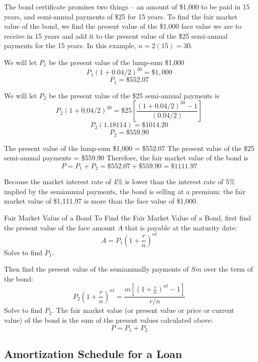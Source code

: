 \begin{solution}
    The bond certificate promises two things – an amount of \$1,000 to be paid in 15 years, and semi-annual payments of \$25 for 15 years. To find the fair market value of the bond, we find the present value of the \$1,000 face value we are to receive in 15 years and add it to the present value of the \$25 semi-annual payments for the 15 years. In this example, \( n = 2(15)=30 \).

    We will let \( P_1 \) be the present value of the lump-sum \$1,000
    \[ P_1(1 + 0.04/2)^{30} = \$1,000 \]
    \[ P_1 = \$552.07 \]

    We will let \( P_2 \) be the present value of the \$25 semi-annual payments is
    \[ P_2 (1 + 0.04/2)^{30} = \$25\left[\frac{(1 + 0.04/2)^{30} - 1}{(0.04/2)}\right] \]
    \[ P_2 (1.18114) = \$1014.20 \]
    \[ P_2 = \$559.90 \]

    The present value of the lump-sum \$1,000 = \$552.07
    The present value of the \$25 semi-annual payments = \$559.90
    Therefore, the fair market value of the bond is
    \[ P = P_1+P_2 = \$552.07 + \$559.90 = \$1111.97 \]

    Because the market interest rate of 4\% is lower than the interest rate of 5\% implied by the semiannual payments, the bond is selling at a premium: the fair market value of \$1,111.97 is more than the face value of \$1,000.
\end{solution}

\begin{summarybox}{Fair Market Value of a Bond}
    To Find the Fair Market Value of a Bond, first find the present value of the face amount \( A \) that is payable at the maturity date:
    \[ A = P_1\left(1 + \frac{r}{n}\right)^{nt}\]
    Solve to find $P_1$.

    Then find the present value of the semiannually payments of \( Sm \) over the term of the bond:
    \[ P_2\left(1 + \frac{r}{n}\right)^{nt} = \frac{m\left[(1 + \frac{r}{n})^{nt} - 1\right]}{r/n}\]
    Solve to find $P_2$.
    The fair market value (or present value or price or current value) of the bond is the sum of the present values calculated above:
    \[ P = P_1 + P_2 \]
\end{summarybox}

\subsection{Amortization Schedule for a Loan}

